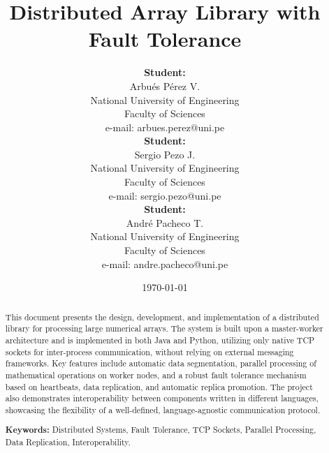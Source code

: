 \documentclass[10pt,a4paper]{article}
\theoremstyle{definition}
\theoremstyle{remark}
\begin{document}
\title{Distributed Array Library with Fault Tolerance}
\author{
    \begin{minipage}[t]{0.3\textwidth}
        \centering
        \textbf{Student:}\\[5pt]
        {\large Arbués Pérez V.}\\
        National University of Engineering\\
        Faculty of Sciences\\
        e-mail: arbues.perez@uni.pe
    \end{minipage}
    \hfill
    \begin{minipage}[t]{0.3\textwidth}
        \centering
        \textbf{Student:}\\[5pt]
        {\large Sergio Pezo J.}\\
        National University of Engineering\\
        Faculty of Sciences\\
        e-mail: sergio.pezo@uni.pe
    \end{minipage}
    \hfill
    \begin{minipage}[t]{0.3\textwidth}
        \centering
        \textbf{Student:}\\[5pt]
        {\large André Pacheco T.}\\
        National University of Engineering\\
        Faculty of Sciences\\
        e-mail: andre.pacheco@uni.pe
    \end{minipage}
}
\date{\today}
\maketitle

\begin{abstract}
\hspace*{0.5cm}
This document presents the design, development, and implementation of a distributed library for processing large numerical arrays. The system is built upon a master-worker architecture and is implemented in both Java and Python, utilizing only native TCP sockets for inter-process communication, without relying on external messaging frameworks. Key features include automatic data segmentation, parallel processing of mathematical operations on worker nodes, and a robust fault tolerance mechanism based on heartbeats, data replication, and automatic replica promotion. The project also demonstrates interoperability between components written in different languages, showcasing the flexibility of a well-defined, language-agnostic communication protocol.

\vspace{5pt}
\textbf{Keywords:} Distributed Systems, Fault Tolerance, TCP Sockets, Parallel Processing, Data Replication, Interoperability.
\end{abstract}
\end{document}
